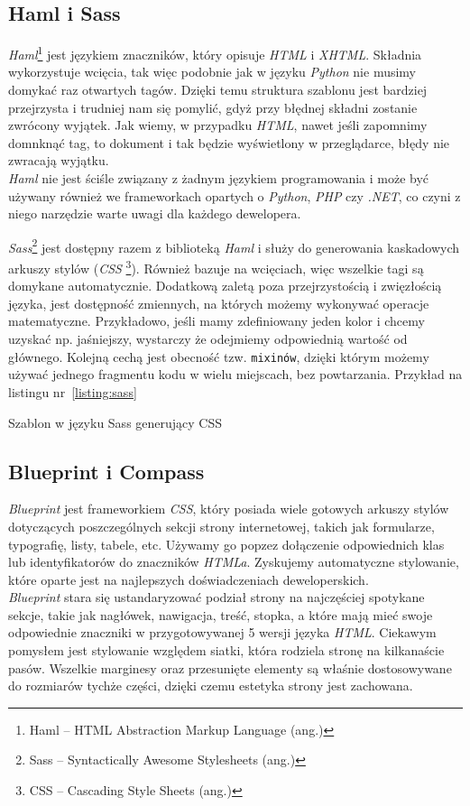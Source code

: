 \documentclass[a4paper,12pt]{article}
\begin{document}
\subsection{Haml i Sass}
\emph{Haml}\footnote{Haml -- HTML Abstraction Markup Language (ang.)} jest językiem
znaczników, który opisuje \emph{HTML} i \emph{XHTML}. Składnia wykorzystuje wcięcia, tak więc podobnie
jak w języku \emph{Python} nie musimy domykać raz otwartych tagów. Dzięki temu struktura
szablonu jest bardziej przejrzysta i trudniej nam się pomylić, gdyż przy błędnej składni
zostanie zwrócony wyjątek. Jak wiemy, w przypadku \emph{HTML}, nawet jeśli zapomnimy
domnknąć tag, to dokument i tak będzie wyświetlony w przeglądarce, błędy nie zwracają
wyjątku.\\
\emph{Haml} nie jest ściśle związany z żadnym językiem programowania i może być używany
również we frameworkach opartych o \emph{Python}, \emph{PHP} czy \emph{.NET}, co czyni
z niego narzędzie warte uwagi dla każdego dewelopera.


\emph{Sass}\footnote{Sass -- Syntactically Awesome Stylesheets (ang.)} jest dostępny razem
z biblioteką \emph{Haml} i służy do generowania kaskadowych arkuszy stylów (\emph{CSS
}\footnote{CSS -- Cascading Style Sheets (ang.)}). Również bazuje na wcięciach, więc
wszelkie tagi są domykane automatycznie. Dodatkową zaletą poza przejrzystością i
zwięzłością języka, jest dostępność zmiennych, na których możemy wykonywać operacje
matematyczne. Przykładowo, jeśli mamy zdefiniowany jeden kolor i chcemy uzyskać np.
jaśniejszy, wystarczy że odejmiemy odpowiednią wartość od głównego. Kolejną cechą jest
obecność tzw. \texttt{mixinów}, dzięki którym możemy używać jednego fragmentu kodu w wielu
miejscach, bez powtarzania. Przykład na listingu nr~\ref{listing:sass}

\begin{listing}
  
  \caption{Szablon w języku Sass generujący CSS}
  \label{listing:sass}
\end{listing}


\subsection{Blueprint i Compass}
\emph{Blueprint} jest frameworkiem \emph{CSS}, który posiada wiele gotowych arkuszy stylów
dotyczących poszczególnych sekcji strony internetowej, takich jak formularze, typografię,
listy, tabele, etc. Używamy go popzez dołączenie odpowiednich klas lub identyfikatorów do
znaczników \emph{HTMLa}. Zyskujemy automatyczne stylowanie, które oparte jest na
najlepszych doświadczeniach deweloperskich.\\
\emph{Blueprint} stara się ustandaryzować podział strony na najczęściej spotykane sekcje,
takie jak nagłówek, nawigacja, treść, stopka, a które mają mieć swoje odpowiednie
znaczniki w przygotowywanej 5 wersji języka \emph{HTML}. Ciekawym pomysłem jest
stylowanie względem siatki, która rodziela stronę na kilkanaście pasów. Wszelkie marginesy
oraz przesunięte elementy są właśnie dostosowywane do rozmiarów tychże części, dzięki czemu
estetyka strony jest zachowana.
\end{document}
